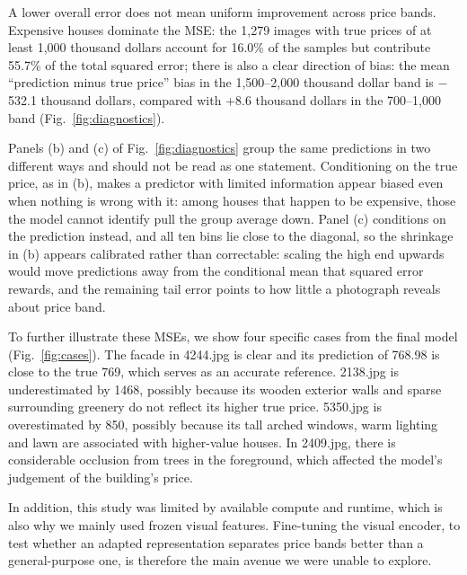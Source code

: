 
A lower overall error does not mean uniform improvement across price bands. Expensive houses dominate the MSE: the 1,279 images with true prices of at least 1,000 thousand dollars account for 16.0\% of the samples but contribute 55.7\% of the total squared error; there is also a clear direction of bias: the mean ``prediction minus true price'' bias in the 1,500--2,000 thousand dollar band is \ensuremath{-}532.1 thousand dollars, compared with +8.6 thousand dollars in the 700--1,000 band (Fig.~\ref{fig:diagnostics}).


Panels (b) and (c) of Fig.~\ref{fig:diagnostics} group the same predictions in two different ways and should not be read as one statement. Conditioning on the true price, as in (b), makes a predictor with limited information appear biased even when nothing is wrong with it: among houses that happen to be expensive, those the model cannot identify pull the group average down. Panel (c) conditions on the prediction instead, and all ten bins lie close to the diagonal, so the shrinkage in (b) appears calibrated rather than correctable: scaling the high end upwards would move predictions away from the conditional mean that squared error rewards, and the remaining tail error points to how little a photograph reveals about price band.


To further illustrate these MSEs, we show four specific cases from the final model (Fig.~\ref{fig:cases}). The facade in 4244.jpg is clear and its prediction of 768.98 is close to the true 769, which serves as an accurate reference. 2138.jpg is underestimated by 1468, possibly because its wooden exterior walls and sparse surrounding greenery do not reflect its higher true price. 5350.jpg is overestimated by 850, possibly because its tall arched windows, warm lighting and lawn are associated with higher-value houses. In 2409.jpg, there is considerable occlusion from trees in the foreground, which affected the model's judgement of the building's price.


In addition, this study was limited by available compute and runtime, which is also why we mainly used frozen visual features. Fine-tuning the visual encoder, to test whether an adapted representation separates price bands better than a general-purpose one, is therefore the main avenue we were unable to explore.
